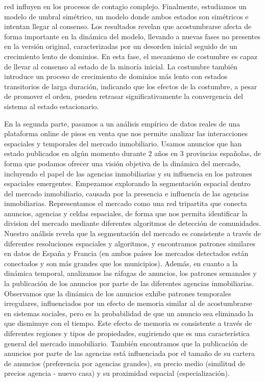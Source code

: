 red influyen en los procesos de contagio complejo. Finalmente, estudiamos un modelo de umbral simétrico, un modelo donde ambos estados son simétricos e intentan llegar al consenso. Los resultados revelan que acostumbrarse afecta de forma importante en la dinámica del modelo, llevando a nuevas fases no presentes en la versión original, caracterizadas por un desorden inicial seguido de un crecimiento lento de dominios. En esta fase, el mecanismo de costumbre es capaz de llevar al consenso al estado de la minoría inicial. La costumbre también introduce un proceso de crecimiento de dominios más lento con estados transitorios de larga duración, indicando que los efectos de la costumbre, a pesar de promover el orden, pueden retrasar significativamente la convergencia del sistema al estado estacionario.

En la segunda parte, pasamos a un análisis empírico de datos reales de una plataforma online de pisos en venta que nos permite analizar las interacciones espaciales y temporales del mercado inmobiliario. Usamos anuncios que han estado publicados en algún momento durante 2 años en 3 provincias españolas, de forma que podamos ofrecer una visión objetiva de la dinámica del mercado, incluyendo el papel de las agencias inmobiliarias y su influencia en los patrones espaciales emergentes. Empezamos explorando la segmentación espacial dentro del mercado inmobiliario, causada por la presencia e influencia de las agencias inmobiliarias. Representamos el mercado como una red tripartita que conecta anuncios, agencias y celdas espaciales, de forma que nos permita identificar la division del mercado mediante diferentes algoritmos de detección de comunidades. Nuestro análisis revela que la segmentación del mercado es consistente a través de diferentes resoluciones espaciales y algoritmos, y encontramos patrones similares en datos de España y Francia (en ambos países los mercados detectados están conectados y son más grandes que los municipios). Además, en cuanto a la dinámica temporal, analizamos las ráfagas de anuncios, los patrones semanales y la publicación de los anuncios por parte de las diferentes agencias inmobiliarias. Observamos que la dinámica de los anuncios exhibe patrones temporales irregulares, influenciados por un efecto de memoria similar al de acostumbrarse en sistemas sociales, pero es la probabilidad de que un anuncio sea eliminado la que disminuye con el tiempo. Este efecto de memoria es consistente a través de diferentes regiones y tipos de propiedades, sugiriendo que es una característica general del mercado inmobiliario. También encontramos que la publicación de anuncios por parte de las agencias está influenciada por el tamaño de su cartera de anuncios (preferencia por agencias grandes), su precio medio (similitud de precios agencia - nuevo casa) y su proximidad espacial (especialización).

